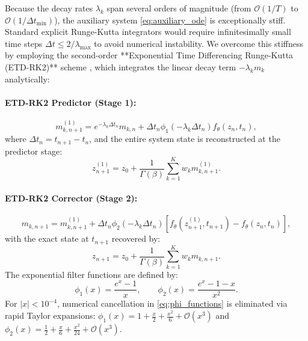 \documentclass[11pt,a4paper]{article}
\theoremstyle{plain}
\theoremstyle{definition}
\newcommand{\dt}{\Delta t}
\begin{document}
Because the decay rates $\lambda_k$ span several orders of magnitude (from $\mathcal{O}(1/T)$ to $\mathcal{O}(1/\dt_{\min})$), the auxiliary system \cref{eq:auxiliary_ode} is exceptionally stiff. Standard explicit Runge-Kutta integrators would require infinitesimally small time steps $\dt \le 2 / \lambda_{\max}$ to avoid numerical instability. We overcome this stiffness by employing the second-order **Exponential Time Differencing Runge-Kutta (ETD-RK2)** scheme \cite{cox2002exponential,hochbruck2010exponential}, which integrates the linear decay term $-\lambda_k m_k$ analytically:

\paragraph{ETD-RK2 Predictor (Stage 1):}
\begin{equation}
    m_{k, n+1}^{(1)} = e^{-\lambda_k \dt_n} m_{k, n} + \dt_n \phi_1(-\lambda_k \dt_n) f_\theta(z_n, t_n),
    \label{eq:etd_stage1}
\end{equation}
where $\dt_n = t_{n+1} - t_n$, and the entire system state is reconstructed at the predictor stage:
\begin{equation}
    z_{n+1}^{(1)} = z_0 + \frac{1}{\Gamma(\beta)} \sum_{k=1}^K w_k m_{k, n+1}^{(1)}.
\end{equation}

\paragraph{ETD-RK2 Corrector (Stage 2):}
\begin{equation}
    m_{k, n+1} = m_{k, n+1}^{(1)} + \dt_n \phi_2(-\lambda_k \dt_n) \left[ f_\theta\left(z_{n+1}^{(1)}, t_{n+1}\right) - f_\theta(z_n, t_n) \right],
    \label{eq:etd_stage2}
\end{equation}
with the exact state at $t_{n+1}$ recovered by:
\begin{equation}
    z_{n+1} = z_0 + \frac{1}{\Gamma(\beta)} \sum_{k=1}^K w_k m_{k, n+1}.
    \label{eq:etd_reconstruction}
\end{equation}
The exponential filter functions are defined by:
\begin{equation}
    \phi_1(x) = \frac{e^x - 1}{x}, \qquad \phi_2(x) = \frac{e^x - 1 - x}{x^2}.
    \label{eq:phi_functions}
\end{equation}
For $|x| < 10^{-4}$, numerical cancellation in \cref{eq:phi_functions} is eliminated via rapid Taylor expansions:
$\phi_1(x) = 1 + \frac{x}{2} + \frac{x^2}{6} + \mathcal{O}(x^3)$ and $\phi_2(x) = \frac{1}{2} + \frac{x}{6} + \frac{x^2}{24} + \mathcal{O}(x^3)$.
\end{document}
